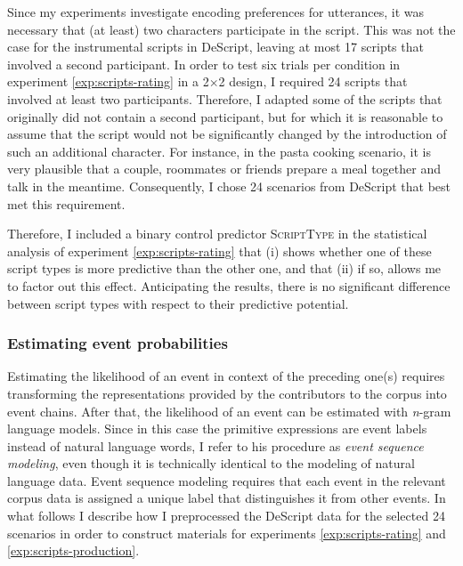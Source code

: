 Since my experiments investigate encoding preferences for utterances, it was necessary that (at least) two characters participate in the script. This was not the case for the instrumental scripts in DeScript, leaving at most 17 scripts that involved a second participant. 
In order to test six trials per condition in experiment \ref{exp:scripts-rating} in a 2$\times$2 design, I required 24 scripts that involved at least two participants. Therefore, I adapted some of the scripts that originally did not contain a second participant, but for which it is reasonable to assume that the script would not be significantly changed by the introduction of such an additional character. For instance, in the pasta cooking scenario, it is very plausible that a couple, roommates or friends prepare a meal together and talk in the meantime. Consequently, I chose 24 scenarios from DeScript that best met this requirement.


Therefore, I included a binary control predictor \textsc{ScriptType} in the statistical analysis of experiment \ref{exp:scripts-rating} that (i) shows whether one of these script types is more predictive than the other one, and that (ii) if so, allows me to factor out this effect. Anticipating the results, there is no significant difference between script types with respect to their predictive potential.

\subsubsection{Estimating event probabilities}
\label{sec:infotheory-scr-corpus-preprocessing}
Estimating the likelihood of an event in context of the preceding one(s) requires transforming the representations provided by the contributors to the corpus into event chains. After that, the likelihood of an event can be estimated with \textit{n}-gram language models. Since in this case the primitive expressions are event labels instead of natural language words, I refer to his procedure as \textit{event sequence modeling}, even though it is technically identical to the modeling of natural language data. Event sequence modeling requires that each event in the relevant corpus data is assigned a unique label that distinguishes it from other events. In what follows I describe how I preprocessed the DeScript data for the selected 24 scenarios in order to construct materials for experiments \ref{exp:scripts-rating} and \ref{exp:scripts-production}.

